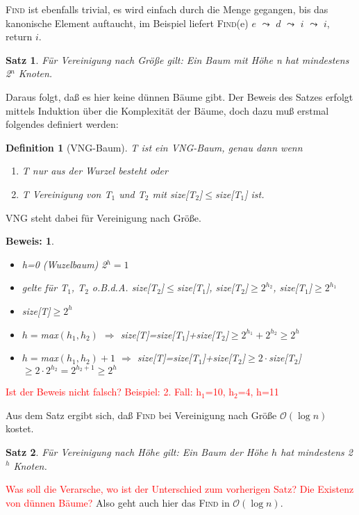 \documentclass[ngerman,draft,parskip=half*,twoside]{scrreprt}
\theoremstyle{break}
\newtheorem{satz}{Satz}[chapter]
\newtheorem{definition}{Definition}[chapter]
\theoremstyle{nonumberbreak}
\newtheorem{beweis}{Beweis:}
\newcommand*{\OO}{\mathcal{O}}      %
\begin{document}
\textsc{Find} ist ebenfalls trivial, es wird einfach durch die Menge gegangen, bis das kanonische Element auftaucht, im
Beispiel liefert \textsc{Find}(e) $e$ $\leadsto$ $d$ $\leadsto$ $i$ $\leadsto$ $i$, return $i$.

\begin{satz}
Für Vereinigung nach Größe gilt: Ein Baum mit Höhe n hat mindestens 2$^n$ Knoten. 
\end{satz}
Daraus folgt, daß es hier keine dünnen Bäume gibt. Der Beweis des Satzes erfolgt mittels Induktion über die
Komplexität der Bäume, doch dazu muß erstmal folgendes definiert werden:
 
\begin{definition}[VNG-Baum]
T ist ein VNG-Baum, genau dann wenn
\begin{enumerate}
\item T nur aus der Wurzel besteht oder
\item T Vereinigung von T$_1$ und T$_2$ mit size[T$_2$]$\leq$size[T$_1$] ist.
\end{enumerate}
\end{definition}
VNG steht dabei für Vereinigung nach Größe.

\begin{beweis}
\begin{itemize}
\item[I.A.] h=0 (Wuzelbaum) 2$^h=1$
\item[I.V.] gelte für T$_1$, T$_2$ o.B.d.A. size[T$_2$]$\leq$size[T$_1$], size[T$_2$]$\geq 2^{h_2}$, size[T$_1$]$\geq
2^{h_1}$
\item[I.B.] size[T]$\geq 2^h$
\item[1. Fall] $h=$max$(h_1, h_2)$ $\Rightarrow$ size[T]=size[T$_1$]+size[T$_2$]$\geq 2^{h_1}+2^{h_2} \geq 2^h$
\item[2. Fall] $h=$max$(h_1, h_2)+1$ $\Rightarrow$ size[T]=size[T$_1$]+size[T$_2$]$\geq 2 \cdot $size[T$_2$]$\geq 2
\cdot 2^{h_2} =2^{h_2+1} \geq 2^h$
\end{itemize}
\end{beweis}

\textcolor{red}{Ist der Beweis nicht falsch? Beispiel: 2. Fall: h$_1$=10, h$_2$=4, h=11}

Aus dem Satz ergibt sich, daß \textsc{Find} bei Vereinigung nach Größe $\OO(\log n)$ kostet.

\begin{satz}
Für Vereinigung nach Höhe gilt: Ein Baum der Höhe $h$ hat mindestens 2$^h$ Knoten.
\end{satz}
\textcolor{red}{Was soll die Verarsche, wo ist der Unterschied zum vorherigen Satz? Die Existenz von dünnen Bäume?}
Also geht auch hier das \textsc{Find} in $\OO(\log n)$.
\end{document}

